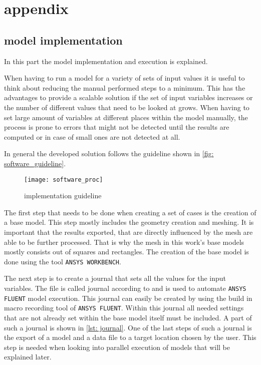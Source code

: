 \documentclass[../thesis.tex]{subfiles}
\begin{document}
\chapter{appendix}

\section{model implementation}

In this part the model implementation and execution is explained.

When having to run a model for a variety of sets of input values it is useful to think about reducing the manual performed steps to a minimum. This has the advantages to provide a scalable solution if the set of input variables increases or the number of different values that need to be looked at grows. When having to set large amount of variables at different places within the model manually, the process is prone to errors that might not be detected until the results are computed or in case of small ones are not detected at all.

In general the developed solution follows the guideline shown in \autoref{fig: software_guideline}.

\begin{figure}[htbp]
	\centering
	\texttt{[image: software\_proc]}
	\caption{implementation guideline}
	\label{fig: software_guideline}
\end{figure}

The first step that needs to be done when creating a set of cases is the creation of a base model. This step mostly includes the geometry creation and meshing. It is important that the results exported, that are directly influenced by the mesh are able to be further processed. That is why the mesh in this work's base models mostly consists out of squares and rectangles. The creation of the base model is done using the tool \texttt{ANSYS WORKBENCH}.

The next step is to create a journal that sets all the values for the input variables. The file is called journal according to \cite{manual2009ansys} and is used to automate \texttt{ANSYS FLUENT} model execution. This journal can easily be created by using the build in macro recording tool of \texttt{ANSYS FLUENT}. Within this journal all needed settings that are not already set within the base model itself must be included. A part of such a journal is shown in \autoref{lst: journal}. One of the last steps of such a journal is the export of a model and a data file to a target location chosen by the user. This step is needed when looking into parallel execution of models that will be explained later.
\end{document}
